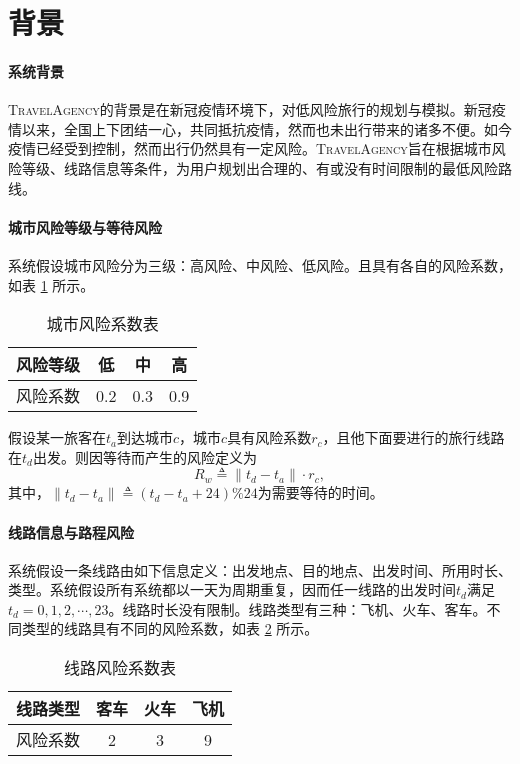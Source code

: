 \section{背景}
\label{sec:preliminary}

\paragraph{系统背景}

\textsc{TravelAgency}的背景是在新冠疫情环境下，对低风险旅行的规划与模拟。新冠疫情以来，全国上下团结一心，共同抵抗疫情，然而也未出行带来的诸多不便。如今疫情已经受到控制，然而出行仍然具有一定风险。\textsc{TravelAgency}旨在根据城市风险等级、线路信息等条件，为用户规划出合理的、有或没有时间限制的最低风险路线。

\paragraph{城市风险等级与等待风险}

系统假设城市风险分为三级：高风险、中风险、低风险。且具有各自的风险系数，如表 \ref{tab:city-level-risk} 所示。
\begin{table}[h]
\centering
\begin{tabular}{cccc}
\toprule
风险等级 & 低 & 中 & 高 \\
\midrule
风险系数 & 0.2 & 0.3 & 0.9 \\
\bottomrule
\end{tabular}
\caption{城市风险系数表}
\label{tab:city-level-risk}
\end{table}

假设某一旅客在$t_a$到达城市$c$，城市$c$具有风险系数$r_c$，且他下面要进行的旅行线路在$t_d$出发。则因等待而产生的风险定义为
\begin{equation}
  R_w \triangleq \| t_d - t_a \| \cdot r_c,
\end{equation}
其中，$\| t_d - t_a \| \triangleq (t_d - t_a + 24) \% 24$为需要等待的时间。

\paragraph{线路信息与路程风险}

系统假设一条线路由如下信息定义：出发地点、目的地点、出发时间、所用时长、类型。系统假设所有系统都以一天为周期重复，因而任一线路的出发时间$t_d$满足$t_d = 0, 1, 2, \cdots, 23$。线路时长没有限制。线路类型有三种：飞机、火车、客车。不同类型的线路具有不同的风险系数，如表 \ref{tab:line-type-risk} 所示。
\begin{table}[h]
\centering
\begin{tabular}{cccc}
\toprule
线路类型 & 客车 & 火车 & 飞机 \\
\midrule
风险系数 & 2 & 3 & 9 \\
\bottomrule
\end{tabular}
\caption{线路风险系数表}
\label{tab:line-type-risk}
\end{table}

